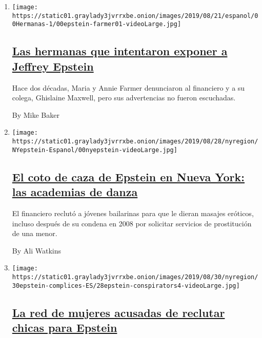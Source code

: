 \begin{enumerate}
\def\labelenumi{\arabic{enumi}.}
\item
  \texttt{[image: https://static01.graylady3jvrrxbe.onion/images/2019/08/21/espanol/00Hermanas-1/00epstein-farmer01-videoLarge.jpg]}

  \hypertarget{las-hermanas-que-intentaron-exponer-a-jeffrey-epstein}{%
  \subsection{\texorpdfstring{\href{/es/2019/08/27/espanol/mundo/jeffrey-epstein-mujeres-denuncias.html}{Las
  hermanas que intentaron exponer a Jeffrey
  Epstein}}{Las hermanas que intentaron exponer a Jeffrey Epstein}}\label{las-hermanas-que-intentaron-exponer-a-jeffrey-epstein}}

  Hace dos décadas, Maria y Annie Farmer denunciaron al financiero y a
  su colega, Ghislaine Maxwell, pero sus advertencias no fueron
  escuchadas.

  By Mike Baker
\item
  \texttt{[image: https://static01.graylady3jvrrxbe.onion/images/2019/08/28/nyregion/NYepstein-Espanol/00nyepstein-videoLarge.jpg]}

  \hypertarget{el-coto-de-caza-de-epstein-en-nueva-york-las-academias-de-danza}{%
  \subsection{\texorpdfstring{\href{/es/2019/09/03/espanol/mundo/epstein-bailarinas-nueva-york.html}{El
  coto de caza de Epstein en Nueva York: las academias de
  danza}}{El coto de caza de Epstein en Nueva York: las academias de danza}}\label{el-coto-de-caza-de-epstein-en-nueva-york-las-academias-de-danza}}

  El financiero reclutó a jóvenes bailarinas para que le dieran masajes
  eróticos, incluso después de su condena en 2008 por solicitar
  servicios de prostitución de una menor.

  By Ali Watkins
\item
  \texttt{[image: https://static01.graylady3jvrrxbe.onion/images/2019/08/30/nyregion/30epstein-complices-ES/28epstein-conspirators4-videoLarge.jpg]}

  \hypertarget{la-red-de-mujeres-acusadas-de-reclutar-chicas-para-epstein}{%
  \subsection{\texorpdfstring{\href{/es/2019/08/30/espanol/mundo/jeffrey-epstein-ghislaine-maxwell.html}{La
  red de mujeres acusadas de reclutar chicas para
  Epstein}}{La red de mujeres acusadas de reclutar chicas para Epstein}}\label{la-red-de-mujeres-acusadas-de-reclutar-chicas-para-epstein}}


\end{enumerate}

